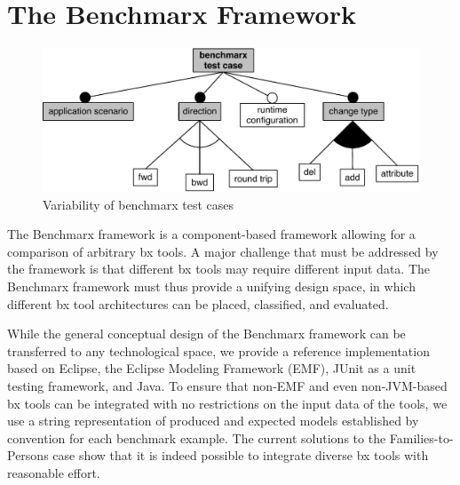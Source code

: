 \section{The Benchmarx Framework}
\label{sec:Benchmarx}

%

\begin{figure}[tb!]
	\centering
	\includegraphics[width=\columnwidth]{diagrams/framework/feature-model-benchmarx-test-case}
	\caption{Variability of benchmarx test cases}
	\label{fig:featureModelBenchmarxTestCase}
\end{figure}

The Benchmarx framework is a component-based framework allowing for a comparison of arbitrary bx tools. 
A major challenge that must be addressed by the framework is that different bx tools may require different input data. 
The Benchmarx framework must thus provide a unifying design space, in which different bx tool architectures can be placed, classified, and evaluated. 

While the general conceptual design of the Benchmarx framework can be transferred to any technological space, we provide a reference implementation based on Eclipse, the Eclipse Modeling Framework (EMF), JUnit as a unit testing framework, and Java.
To ensure that non-EMF and even non-JVM-based bx tools can be integrated with no restrictions on the input data of the tools, we use a string representation of produced and expected models established by convention for each benchmark example.
The current solutions to the Families-to-Persons case show that it is indeed possible to integrate diverse bx tools with reasonable effort.


